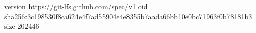 version https://git-lfs.github.com/spec/v1
oid sha256:3c198530f8ca624e4f7ad55904e4e8355b7aada66bb10e0bc71963f0b78181b3
size 202446
